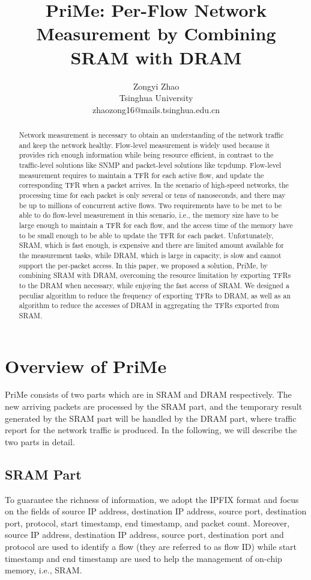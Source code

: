 \documentclass[10pt, conference, letterpaper]{IEEEtran}
\begin{document}
\title{PriMe: Per-Flow Network Measurement by Combining SRAM with DRAM}
\author{Zongyi Zhao\\ Tsinghua University\\ zhaozong16@mails.tsinghua.edu.cn}
\maketitle
\begin{abstract}
Network measurement is necessary to obtain an understanding of the network traffic and keep the network healthy. Flow-level measurement is widely used because it provides rich enough information while being resource efficient, in contrast to the traffic-level solutions like SNMP and packet-level solutions like tcpdump. Flow-level measurement requires to maintain a TFR for each active flow, and update the corresponding TFR when a packet arrives. In the scenario of high-speed networks, the processing time for each packet is only several or tens of nanoseconds, and there may be up to millions of concurrent active flows. Two requirements have to be met to be able to do flow-level measurement in this scenario, i.e., the memory size have to be large enough to maintain a TFR for each flow, and the access time of the memory have to be small enough to be able to update the TFR for each packet. Unfortunately, SRAM, which is fast enough, is expensive and there are limited amount available for the measurement tasks, while DRAM, which is large in capacity, is slow and cannot support the per-packet access. In this paper, we proposed a solution, PriMe, by combining SRAM with DRAM, overcoming the resource limitation by exporting TFRs to the DRAM when necessary, while enjoying the fast access of SRAM. We designed a peculiar algorithm to reduce the frequency of exporting TFRs to DRAM, as well as an algorithm to reduce the accesses of DRAM in aggregating the TFRs exported from SRAM. 
\end{abstract}
\section{Overview of PriMe}
PriMe consists of two parts which are in SRAM and DRAM respectively. The new arriving packets are processed by the SRAM part, and the temporary result generated by the SRAM part will be handled by the DRAM part, where traffic report for the network traffic is produced. In the following, we will describe the two parts in detail.

\subsection{SRAM Part}
To guarantee the richness of information, we adopt the IPFIX\cite{trammell_flow_2013} format and focus on the fields of source IP address, destination IP address, source port, destination port, protocol, start timestamp, end timestamp, and packet count. Moreover, source IP address, destination IP address, source port, destination port and protocol are used to identify a flow (they are referred to as flow ID) while start timestamp and end timestamp are used to help the management of on-chip memory, i.e., SRAM.
\end{document}
